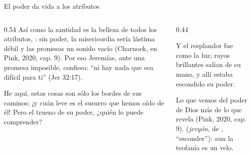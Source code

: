 \begin{frame}{El poder da vida a los atributos}
\begin{columns}[t,onlytextwidth]
\begin{column}{0.54\textwidth}\small
Así como la santidad es la belleza de todos los atributos, : sin poder, la misericordia sería lástima débil y las promesas un sonido vacío (Charnock, en Pink, 2020, cap. 9). Por eso Jeremías, ante una promesa imposible, confiesa: ``ni hay nada que sea difícil para ti'' (Jer 32:17).\par\medskip
\begin{cita}He aquí, estas cosas son sólo los bordes de sus caminos; ¡y cuán leve es el susurro que hemos oído de él! Pero el trueno de su poder, ¿quién lo puede comprender?\end{cita}
\end{column}
\begin{column}{0.44\textwidth}
\begin{center}\small{}\end{center}
\begin{cita}Y el resplandor fue como la luz; rayos brillantes salían de su mano, y allí estaba escondido su poder.\end{cita}
\scriptsize Lo que vemos del poder de Dios  más de lo que revela (Pink, 2020, cap. 9).  (\emph{jevyón}, de , ``esconder''): aun la teofanía es un velo.
\end{column}
\end{columns}
\end{frame}

